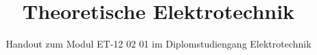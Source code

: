 

\title[Theoretische Elektrotechnik]{Theoretische Elektrotechnik}

\subtitle{Handout zum Modul ET-12 02 01 im Diplomstudiengang Elektrotechnik}

% 
% 

\maketitle

% 
% 


